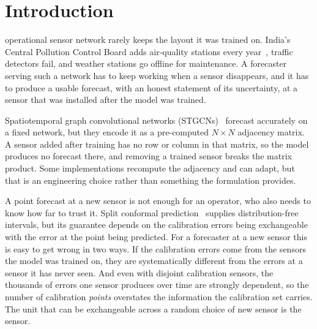 \documentclass[journal,twoside,web]{ieeecolor}
\begin{document}
\section{Introduction}
\label{sec:introduction}
 operational sensor network rarely keeps the layout it was trained on. India's
Central Pollution Control Board adds air-quality stations every year~\cite{panja2026estgcn}, traffic
detectors fail, and weather stations go offline for maintenance. A forecaster serving such a network
has to keep working when a sensor disappears, and it has to produce a usable forecast, with an
honest statement of its uncertainty, at a sensor that was installed after the model was trained.

Spatiotemporal graph convolutional networks (STGCNs)~\cite{yu2018stgcn} forecast accurately on a
fixed network, but they encode it as a pre-computed $N\times N$ adjacency matrix. A sensor added after
training has no row or column in that matrix, so the model produces no forecast there, and removing a
trained sensor breaks the matrix product. Some implementations recompute the adjacency and can adapt,
but that is an engineering choice rather than something the formulation provides.

A point forecast at a new sensor is not enough for an operator, who also needs to know how far to
trust it. Split conformal prediction~\cite{vovk2005algorithmic,angelopoulos2023conformal} supplies
distribution-free intervals, but its guarantee depends on the calibration errors being exchangeable
with the error at the point being predicted. For a forecaster at a new sensor this is easy to get
wrong in two ways. If the calibration errors come from the sensors the model was trained on, they are
systematically different from the errors at a sensor it has never seen. And even with disjoint
calibration sensors, the thousands of errors one sensor produces over time are strongly dependent,
so the number of calibration \emph{points} overstates the information the calibration set carries.
The unit that can be exchangeable across a random choice of new sensor is the sensor.
\end{document}
